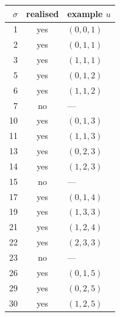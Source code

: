 \begin{tabular}{@{}rcl@{}}
\toprule
$\sigma$ & realised & example $u$ \\ \midrule
1 & yes & $(0,0,1)$ \\
2 & yes & $(0,1,1)$ \\
3 & yes & $(1,1,1)$ \\
5 & yes & $(0,1,2)$ \\
6 & yes & $(1,1,2)$ \\
7 & no & --- \\
10 & yes & $(0,1,3)$ \\
11 & yes & $(1,1,3)$ \\
13 & yes & $(0,2,3)$ \\
14 & yes & $(1,2,3)$ \\
15 & no & --- \\
17 & yes & $(0,1,4)$ \\
19 & yes & $(1,3,3)$ \\
21 & yes & $(1,2,4)$ \\
22 & yes & $(2,3,3)$ \\
23 & no & --- \\
26 & yes & $(0,1,5)$ \\
29 & yes & $(0,2,5)$ \\
30 & yes & $(1,2,5)$ \\
\bottomrule
\end{tabular}
